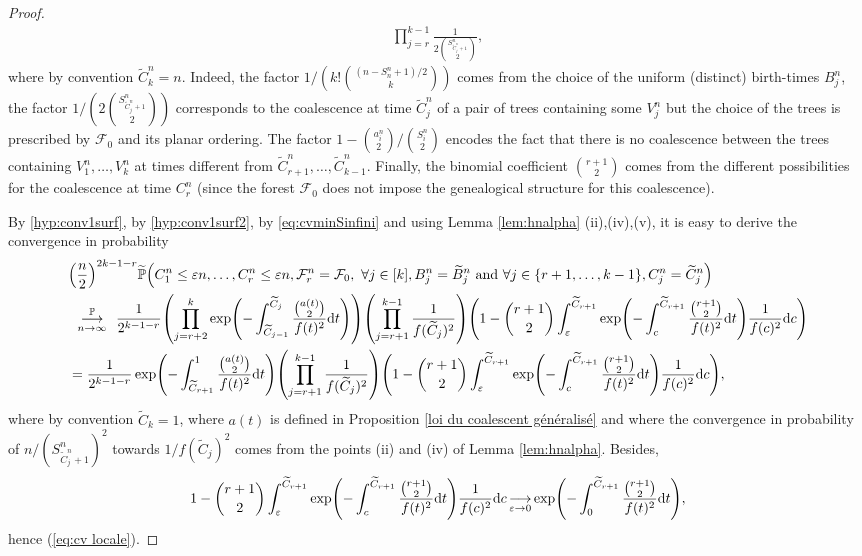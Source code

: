 \documentclass[11pt]{article}
\theoremstyle{plain}
\theoremstyle{definition}
\theoremstyle{remark}
\renewcommand{\P}{{\mathbb{P}}} %
\newcommand{\1}{\mathbbm{1}} %
\newcommand{\proba}[1]{\mathbb{P}\left(#1\right)} %
\newcommand{\e}{\varepsilon} %
\newcommand{\cvproba}[1][n]{\enskip\mathop{\longrightarrow}^{\P}_{#1 \to \infty}\enskip}
\let\originalleft\left
\let\originalright\right
\renewcommand{\left}{\mathopen{}\mathclose\bgroup\originalleft}
\renewcommand{\right}{\aftergroup\egroup\originalright}
\begin{document}
\begin{proof}
\begin{align*}
\prod_{j=r}^{k-1} \frac{1}{2\displaystyle\binom{S^n_{\widetilde{C}^n_j+1}}{2}}
,
\end{align*}
where by convention $\widetilde{C}_k^n= n$. Indeed, the factor $ 1/({k!{\binom{{(n-S^n_n+1) / 2}}{k}}})$ comes from the choice of the uniform (distinct) birth-times $B^n_j$, the factor ${1 / (2\binom{S^n_{\widetilde{C}^n_j+1}}{2})}$ corresponds to the coalescence at time $\widetilde{C}^n_j$ of a pair of trees containing some $V^n_j$ but the choice of the trees is prescribed by $\mathcal{F}_0$ and its planar ordering. The factor $ 1- {\binom{a^n_i}{2} / \binom{S_i^n}{2}}$ encodes the fact that there {is no} coalescence between the trees containing $V^n_1, \ldots, V^n_k$ at times different from $\widetilde{C}^n_{r+1}, \ldots, \widetilde{C}^n_{k-1}$. Finally, the binomial coefficient $\binom{r+1}{2}$ comes from the different possibilities for the coalescence at time $C^n_r$ (since the forest $\mathcal{F}_0$ does not impose the genealogical structure for this coalescence).

By \ref{hyp:conv1surf}, by \ref{hyp:conv1surf2}, by \eqref{eq:cvminSinfini} and using Lemma \ref{lem:hnalpha} (ii),(iv),(v), it is easy to derive the convergence in probability
\begin{align*}
&\left(\frac{n}{2} \right)^{2k-1-r}
\widetilde{\P}\left(C_1^n\le \e n, \ldots, C_r^n \le \e n, \mathcal{F}^n_r=\mathcal{F}_0, \  \forall j \in [k],  B^n_j=\widetilde{B}_j^n \text{ and } \forall j \in \{r+1,\ldots, k-1\},  C^n_j=\widetilde{C}_j^n \right) \\
&\cvproba[n]
\frac{1}{2^{k-1-r}}
 \left(\prod_{j=r+2}^{k}  \exp\left( -\int_{\widetilde{C}_{j-1}}^{\widetilde{C}_j} \frac{ \binom{a(t)}{2}}{f(t)^2} \mathrm{d}t \right) \right)
\left( \prod_{j=r+1}^{k-1}\frac{1}{f(\widetilde{C}_j)^2} \right)
\left(1-\binom{r+1}{2} \int_\e^{\widetilde{C}_{r+1}} \exp\left(-\int_c^{\widetilde{C}_{r+1}} \frac{\binom{r+1}{2}}{f(t)^2}\mathrm{d}t\right) \frac{1}{f(c)^2} \mathrm{d}c\right)\\
&=
\frac{1}{2^{k-1-r}}   \exp\left( -\int_{\widetilde{C}_{r+1}}^{1} \frac{ \binom{a(t)}{2}}{f(t)^2} \mathrm{d}t \right) 
\left( \prod_{j=r+1}^{k-1}\frac{1}{f(\widetilde{C}_j)^2} \right)
\left(1-\binom{r+1}{2} \int_\e^{\widetilde{C}_{r+1}} \exp\left(-\int_c^{\widetilde{C}_{r+1}} \frac{\binom{r+1}{2}}{f(t)^2}\mathrm{d}t\right) \frac{1}{f(c)^2} \mathrm{d}c\right)
,
\end{align*}
where by convention $\widetilde{C}_k=1$, where $a(t)$ is defined in Proposition \ref{loi du coalescent généralisé} and where the convergence in probability of $n/(S^n_{\widetilde{C}^n_j +1})^2$ towards $1/f(\widetilde{C}_j)^2$ comes from the points (ii) and (iv) of Lemma \ref{lem:hnalpha}. Besides,
\[
1-\binom{r+1}{2} \int_\e^{\widetilde{C}_{r+1}} \exp\left(-\int_c^{\widetilde{C}_{r+1}} \frac{\binom{r+1}{2}}{f(t)^2}\mathrm{d}t\right) \frac{1}{f(c)^2} \mathrm{d}c
\mathop{\longrightarrow}\limits_{\e \to 0}\exp\left(- \int_0^{\widetilde{C}_{r+1}} \frac{\binom{r+1}{2}}{f(t)^2} \mathrm{d}t\right),
\]
hence (\ref{eq:cv locale}). 


\end{proof}
\end{document}
